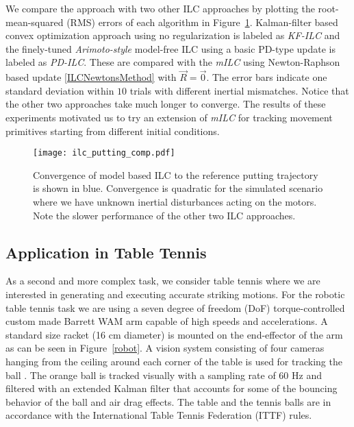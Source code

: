 We compare the approach with two other ILC approaches by plotting the root-mean-squared (RMS) errors of each algorithm in Figure~\ref{ILCTrajectoryPutting}. Kalman-filter based convex optimization approach \cite{Schoellig12} using no regularization is labeled as \emph{KF-ILC} and the finely-tuned \emph{Arimoto-style} \cite{Arimoto84} model-free ILC using a basic PD-type update is labeled as \emph{PD-ILC}. These are compared with the \emph{mILC} using Newton-Raphson based update \eqref{ILCNewtonsMethod} with $\vec{R} = \vec{0}$. The error bars indicate one standard deviation within $10$ trials with different inertial mismatches. Notice that the other two approaches take much longer to converge. The results of these experiments motivated us to try an extension of \emph{mILC} for tracking movement primitives starting from different initial conditions.

\begin{figure}
\centering
\texttt{[image: ilc\_putting\_comp.pdf]}
\caption{Convergence of model based ILC to the reference putting trajectory is shown in blue. Convergence is quadratic for the simulated scenario where we have unknown inertial disturbances acting on the motors. Note the slower performance of the other two ILC approaches.}
\label{ILCTrajectoryPutting}
\end{figure}


\subsection{Application in Table Tennis}


As a second and more complex task, we consider table tennis where we are interested in generating and executing accurate striking motions. For the robotic table tennis task we are using a seven degree of freedom (DoF) torque-controlled custom made Barrett WAM arm capable of high speeds and accelerations. A standard size racket (16 cm diameter) is mounted on the end-effector of the arm as can be seen in Figure~\ref{robot}. A vision system consisting of four cameras hanging from the ceiling around each corner of the table is used for tracking the ball \cite{Lampert12}. The orange ball is tracked  visually with a sampling rate of 60 Hz and filtered with an extended Kalman filter that accounts for some of the bouncing behavior of the ball and air drag effects. The table and the tennis balls are in accordance with the International Table Tennis Federation (ITTF) rules.

